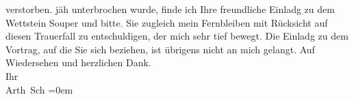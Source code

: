 \begin{ledgroupsized}[t]{13cm}
{{{                  verstorben.}}}\label{K_L03019-2h} jäh unterbrochen wurde, finde ich Ihre freundliche Einladg zu
               dem Wettstein Souper und
                  bitte\textcolor{gray}{,} Sie zugleich mein Fernbleiben mit Rücksicht auf diesen
               Trauerfall zu entschuldigen, der mich sehr tief bewegt.\pend
           \pstart
           Die Einladg zu dem Vortrag, auf die Sie sich beziehen, ist übrigens nicht an mich
               gelangt.\pend
           \pstart
           Auf Wiedersehen und herzlichen Dank. {\\[\baselineskip]}Ihr {\\[\baselineskip]}\spacefill\mbox{Arth Sch}\pend
           \leftskip=0em{}
         
         \endnumbering{}\end{ledgroupsized}  \newcommand{\dateiname}{L03019}\newcommand{\titel}{Arthur Schnitzler an Felix Salten, 17. 5. 1917}\newcommand{\editorInnen}{Martin Anton Müller und Laura Untner}
      